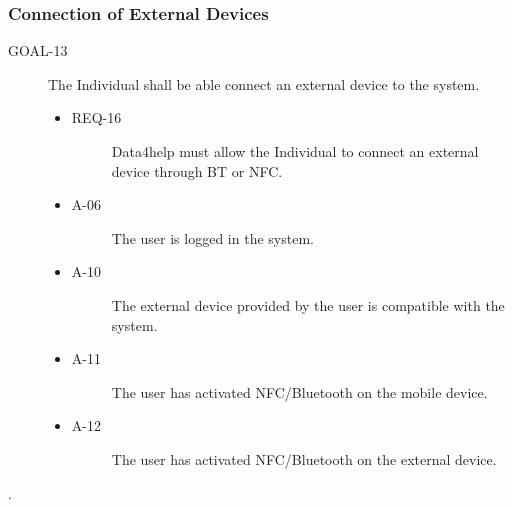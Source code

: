 \documentclass[a4paper]{article}
\newcommand{\requirement}{\ding{229}}%
\begin{document}
        
        
        \subsubsection{Connection of External Devices}

 \begin{description}
        	\item[GOAL-13] The Individual shall be able connect an external device to the system.
            	\begin{itemize}
            	    \item[\requirement]
                	\begin{description}
                	\item[REQ-16] Data4help must allow the Individual to connect an external device through BT or NFC.
                	\end{description}
                	\item
                	\begin{description}
                	\item[A-06] The user is logged in the system.
                	\end{description}
                	\item
                	\begin{description}
                	\item[A-10] The external device provided by the user is compatible with the system.
                	\end{description}
                	\item
                	\begin{description}
                	\item[A-11] The user has activated NFC/Bluetooth on the mobile device.
                	\end{description}
                	\item
                	\begin{description}
                	\item[A-12] The user has activated NFC/Bluetooth on the external device.
                	\end{description}
                	\end{itemize}
        \end{description}.
        
\end{document}
